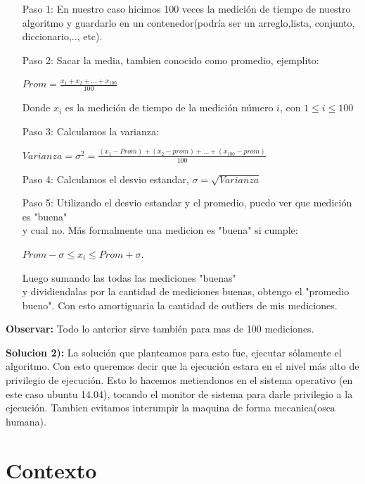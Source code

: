 \documentclass[a4paper]{article}
\begin{document}
\begin{itemize}
	\item[Paso 1:] En nuestro caso hicimos 100 veces la medición de tiempo de nuestro algoritmo y guardarlo en un contenedor(podría ser un arreglo,lista, conjunto, diccionario,.., etc).
	\item[Paso 2:] Sacar la media, tambien conocido como promedio, ejemplito:
		\begin{center} $ Prom =\frac{x_1+x_2+...+x_{100}}{100}$ \end{center}
		Donde $x_i$ es la medición de tiempo de la medición número $i$, con $1 \leq i \leq 100$ 
	\item[Paso 3:] Calculamos la varianza: 			
				\begin{center}
					$Varianza = \sigma^2 = \frac{(x_1 - Prom)+ (x_2 - prom)+ ...+ (x_{100} - prom)}{100} $
				\end{center}
	\item[Paso 4:] Calculamos el desvio estandar,  $\sigma = \sqrt{Varianza}$
	\item[Paso 5:] Utilizando el desvio estandar y el promedio, puedo ver que medición es "buena"  \\ y cual no. Más formalmente una medicion es "buena" si cumple: 
					\begin{center}
					$Prom - \sigma \leq x_i \leq Prom + \sigma $. %
					\end{center}
	 Luego sumando las todas las mediciones  "buenas" \\ y dividiendalas por la cantidad de mediciones buenas, obtengo el "promedio bueno". Con esto amortiguaria la cantidad de outliers de mis mediciones. 			
\end{itemize}

\textbf{Observar:} Todo lo anterior sirve también para mas de 100 mediciones. \newline

\textbf{Solucion 2):} La solución que planteamos para esto fue, ejecutar sólamente el algoritmo. Con esto queremos decir que la ejecución estara en el nivel más alto de privilegio de ejecución. Esto lo hacemos metiendonos en el sistema operativo (en este caso ubuntu 14.04), tocando el monitor de sistema para darle privilegio a la ejecución. Tambien evitamos interumpir la maquina de forma mecanica(osea humana).  




\section{Contexto}
\end{document}
